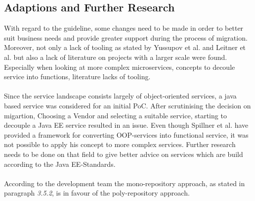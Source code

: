 \documentclass[a4paper,twoside,11pt, pagesize]{scrartcl}
\begin{document}
\begin{spacing}{1.2}
\subsection{Adaptions and Further Research}
With regard to the guideline, some changes need to be made in order to better suit business needs and provide greater support during the process of migration. Moreover, not only a lack of tooling as stated by Yussupov et al. and Leitner et al. but also a lack of literature on projects with a larger scale were found. Especially when looking at more complex microservices, concepts to decoule service into functions, literature lacks of tooling. \\\\
Since the service landscape consists largely of object-oriented services, a java based service was considered for an initial PoC. After scrutinising the decision on migartion, Choosing a Vendor and selecting a suitable service, starting to decouple a Java EE service resulted in an issue. Even though Spillner et al. have provided a framework for converting OOP-services into functional service, it was not possible to apply his concept to more complex services. Further research needs to be done on that field to give better advice on services which are build according to the Java EE-Standards. \\\\
According to the development team the mono-repository approach, as stated in paragraph \textit{3.5.2}, is in favour of the poly-repository approach. %
\newpage

\end{spacing}
\end{document}
